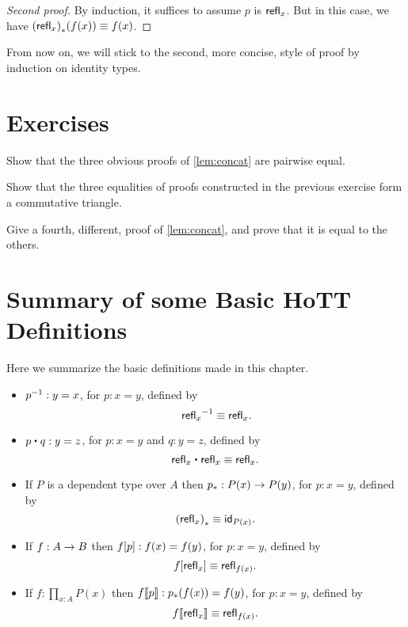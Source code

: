 \begin{proof}[Second proof]
  By induction, it suffices to assume $p$ is $\refl x$.
  But in this case, we have $\trans{(\refl{x})}{f(x)}\jdeq f(x)$.
\end{proof}

From now on, we will stick to the second, more concise, style of proof by induction on identity types.


\section*{Exercises}
\label{basics:exercises}

\begin{ex}\label{ex:basics:concat}
  Show that the three obvious proofs of \autoref{lem:concat} are pairwise equal.
\end{ex}

\begin{ex}
  Show that the three equalities of proofs constructed in the previous exercise form a commutative triangle.
\end{ex}

\begin{ex}
  Give a fourth, different, proof of \autoref{lem:concat}, and prove that it is equal to the others.
\end{ex}

\section{Summary of  some Basic HoTT Definitions}
\label{sec:basics-summary}

Here we summarize the basic definitions made in this chapter.

\begin{itemize}
\item $\opp{p} : y=x$, for $p:x=y$, defined by
  \[\opp{\;\refl{x}}\jdeq \refl{x}.\]
\item $p\ct q :y=z$, for $p:x=y$ and $q:y=z$, defined by
  \[ \refl{x}\ct\refl{x}\jdeq\refl{x}.\]
\item If $P$ is a dependent type over $A$ then $\transf{p}:P(x)\ra P(y)$, for $p:x=y$, defined by
  \[\transf{(\refl{x})}\jdeq \idfunc[P(x)].\]
\item If $f:A\ra B$ then $\map{f}{p}:f(x)=f(y)$, for $p:x=y$, defined by
  \[\map{f}{\refl{x}}\jdeq \refl{f(x)}.\]
\item If $f:\prod_{x:A}P(x)$ then $\mapdep{f}{p}:\trans{p}{f(x)}=f(y)$, for $p:x=y$, defined by
  \[\mapdep{f}{\refl{x}}\jdeq \refl{f(x)}.\]
\end{itemize}

